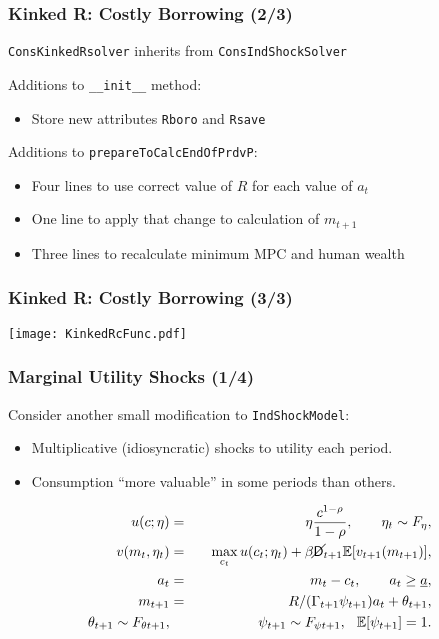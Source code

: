 \documentclass[11pt,handout]{beamer}
\newcommand{\E}{\mathbb{E}}
\newcommand{\bi}{\begin{itemize}}
\newcommand{\ei}{\end{itemize}}
\newcommand{\Die}{\mathsf{D}}
\newcommand{\Live}{\cancel{\Die}}
\begin{document}
\begin{frame}
\frametitle{Kinked R: Costly Borrowing (2/3)}
\texttt{ConsKinkedRsolver} inherits from \texttt{ConsIndShockSolver}

\begin{block}{Additions to \texttt{\_\_init\_\_} method:}
\begin{itemize}
\item Store new attributes \texttt{Rboro} and \texttt{Rsave}
\end{itemize}
\end{block}
\begin{block}{Additions to \texttt{prepareToCalcEndOfPrdvP}:}
\begin{itemize}
\item Four lines to use correct value of $R$ for each value of $a_t$

\item One line to apply that change to calculation of $m_{t+1}$

\item Three lines to recalculate minimum MPC and human wealth
\end{itemize}
\end{block}
\end{frame}


\begin{frame}
\frametitle{Kinked R: Costly Borrowing (3/3)}
\begin{center}
\texttt{[image: KinkedRcFunc.pdf]}
\end{center}
\end{frame}


\begin{frame}
\frametitle{Marginal Utility Shocks (1/4)}
Consider another small modification to \texttt{IndShockModel}:
\bi
\item Multiplicative (idiosyncratic) shocks to utility each period.

\item Consumption ``more valuable'' in some periods than others.
\ei
\begin{eqnarray*}
u(c;\eta) &=& \eta \frac{c^{1-\rho}}{1-\rho}, \qquad \eta_t \sim F_{\eta}, \\
v(m_t,\eta_t) &=& \max_{c_t} u(c_t;\eta_t) + \beta \Live_{t+1} \E [v_{t+1}(m_{t+1}) ], \\
a_t &=& m_t - c_t, \qquad a_t \geq \underline{a}, \\
m_{t+1} &=& R/(\Gamma_{t+1} \psi_{t+1}) a_t + \theta_{t+1}, \\
\theta_{t+1} \sim F_{\theta t+1}, &\qquad& \psi_{t+1} \sim F_{\psi t+1}, \hspace{0.25cm} \E[\psi_{t+1}] = 1.
\end{eqnarray*}
\end{frame}
\end{document}
